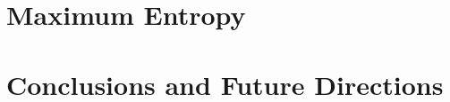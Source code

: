 \documentclass[submission, Phys]{SciPost}
\begin{document}
\section{Maximum Entropy}\label{sec:maxent}

\section{Conclusions and Future Directions}\label{sec:con}


\begin{appendix}


\end{appendix}

\printindex

\nolinenumbers
\end{document}
